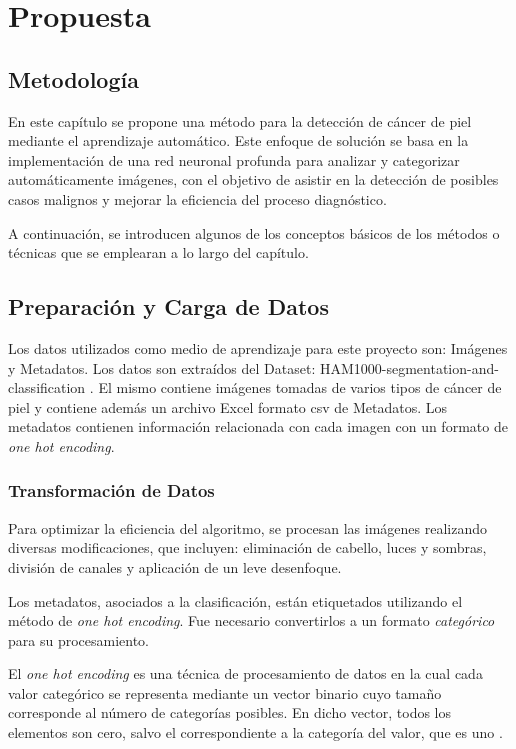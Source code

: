 \chapter{Propuesta}\label{chapter:proposal}

\section{Metodología}\label{sec:method}
En este capítulo se propone una método para la detección de cáncer de piel mediante el aprendizaje automático. Este enfoque de solución se basa en la implementación de una  red neuronal profunda para analizar y categorizar automáticamente imágenes, con el objetivo de asistir en la detección de posibles casos malignos y mejorar la eficiencia del proceso diagnóstico.

A continuación, se introducen algunos de los conceptos básicos de los métodos o técnicas que se emplearan a lo largo del capítulo.

\section{Preparación y Carga de Datos}

 Los datos utilizados como medio de aprendizaje para este proyecto son: Imágenes y Metadatos. Los datos son extraídos del Dataset: HAM1000-segmentation-and-classification  \cite{ham10000}.
 El mismo contiene imágenes tomadas de varios tipos de cáncer de piel y contiene además un archivo Excel formato csv de Metadatos. Los metadatos contienen información relacionada con cada imagen con un formato de \textit{one hot encoding}.

\subsection{Transformación de Datos}

Para optimizar la eficiencia del algoritmo, se procesan las imágenes realizando diversas modificaciones, que incluyen: eliminación de cabello, luces y sombras, división de canales y aplicación de un leve desenfoque.

Los metadatos, asociados a la clasificación, están etiquetados utilizando el método de \textit{one hot encoding}. Fue necesario convertirlos a un formato \textit{categórico} para su procesamiento.

El \textit{one hot encoding} es una técnica de procesamiento de datos en la cual cada valor categórico se representa mediante un vector binario cuyo tamaño corresponde al número de categorías posibles. En dicho vector, todos los elementos son cero, salvo el correspondiente a la categoría del valor, que es uno \cite{ohe}. 

